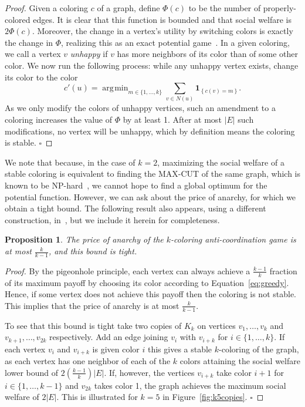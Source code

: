 \documentclass{llncs}
\newcommand{\ind}[1]{\textbf{1}_{\left \{ #1 \right \}}}
\newtheorem{propn}{Proposition}
\DeclareMathOperator*{\argmin}{\arg\!\min}
\begin{document}
\begin{proof}
Given a coloring $c$ of a graph, define $\Phi(c)$ to be the number of
properly-colored edges. It is clear that this function is bounded and that
social welfare is $2 \Phi(c)$. Moreover, the change in a vertex's utility by
switching colors is exactly the change in $\Phi$, realizing this as an exact
potential game~\cite{M96}. In a given coloring, we call a vertex $v$
\emph{unhappy} if $v$ has more neighbors of its color than of some other color.
We now run the following process: while any unhappy vertex exists, change its
color to the color
\begin{equation}\label{eq:greedy}
c'(u) = \argmin_{m \in \{1, \ldots, k\}} \sum_{ v \in N(u)}\ind{c(v) = m}.
\end{equation}
As we only modify the colors of unhappy vertices, such an amendment to a
coloring increases the value of $\Phi$ by at least 1. After at most $|E|$ such
modifications, no vertex will be unhappy, which by definition means the coloring
is stable. \hfill $\square$
\end{proof}

We note that because, in the case of $k=2$, maximizing the social welfare of a
stable coloring is equivalent to finding the MAX-CUT of the same graph, which is
known to be NP-hard~\cite{GareyJ79}, we cannot hope to find a global optimum for
the potential function.  However, we can ask about the price of anarchy, for
which we obtain a tight bound.  The following result also appears, using a
different construction, in~\cite{Hoefer2007}, but we include it herein for
completeness.

\begin{propn}\label{obs:poa}
The price of anarchy of the $k$-coloring anti-coordination game is at most
$\frac{k}{k-1}$, and this bound is tight.
\end{propn}

\begin{proof}
By the pigeonhole principle, each vertex can always achieve a $\frac{k-1}{k}$
fraction of its maximum payoff by choosing its color according to
Equation~\ref{eq:greedy}.  Hence, if some vertex does not achieve this payoff
then the coloring is not stable.  This implies that the price of anarchy is at
most $\frac{k}{k-1}$.

To see that this bound is tight take two copies of $K_k$ on vertices $v_1,
\dots, v_k$ and $v_{k+1}, \dots, v_{2k}$ respectively. Add an edge joining $v_i$
with $v_{i+k}$ for $i\in \{1,\dots,k\}$. If each vertex $v_i$ and $v_{i+k}$ is
given color $i$ this gives a stable $k$-coloring of the graph, as each vertex
has one neighbor of each of the $k$ colors attaining the social welfare lower
bound of $2(\frac{k-1}{k})|E|$. If, however, the vertices $v_{i+k}$ take color
$i+1$ for $i\in\{1,\dots,k-1\}$ and $v_{2k}$ takes color 1, the graph achieves
the maximum social welfare of $2|E|$.  This is illustrated for $k=5$ in
Figure~\ref{fig:k5copies}.
\hfill
$\square$\end{proof}
\end{document}

